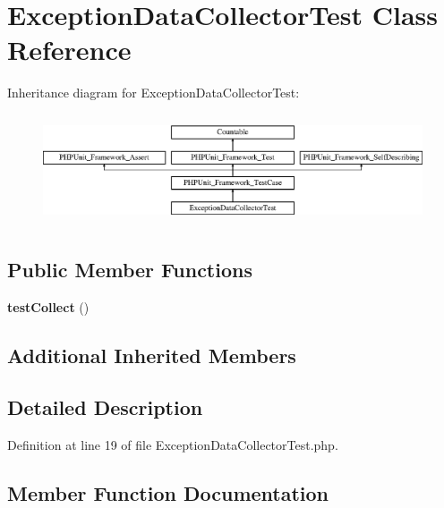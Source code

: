 \section{Exception\+Data\+Collector\+Test Class Reference}
\label{class_symfony_1_1_component_1_1_http_kernel_1_1_tests_1_1_data_collector_1_1_exception_data_collector_test}
Inheritance diagram for Exception\+Data\+Collector\+Test\+:\begin{figure}[H]
\begin{center}
\leavevmode
\includegraphics[height=3.303835cm]{class_symfony_1_1_component_1_1_http_kernel_1_1_tests_1_1_data_collector_1_1_exception_data_collector_test}
\end{center}
\end{figure}
\subsection*{Public Member Functions}
\begin{DoxyCompactItemize}
\item 
{\bf test\+Collect} ()
\end{DoxyCompactItemize}
\subsection*{Additional Inherited Members}


\subsection{Detailed Description}


Definition at line 19 of file Exception\+Data\+Collector\+Test.\+php.



\subsection{Member Function Documentation}
